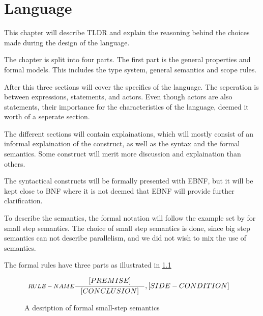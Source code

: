 \chapter{Language}\label{part:design}

This chapter will describe TLDR and explain the reasoning behind the choices made during the design of the language.

The chapter is split into four parts. The first part is the general properties and formal models. This includes the type system, general semantics and scope rules.

After this three sections will cover the specifics of the language. The seperation is between expressions, statements, and actors. Even though actors are also statements, their importance for the characteristics of the language, deemed it worth of a seperate section.

The different sections will contain explainations, which will mostly consist of an informal explaination of the construct, as well as the syntax and the formal semantics. Some construct will merit more discussion and explaination than others.

The syntactical constructs will be formally presented with EBNF, but it will be kept close to BNF where it is not deemed that EBNF will provide further clarification. 

To describe the semantics, the formal notation will follow the example set by \cite{huttel2010transitions} for small step semantics. The choice of small step semantics is done, since big step semantics can not describe parallelism, and we did not wish to mix the use of semantics.

The formal rules have three parts as illustrated in \cref{SS-semantics}

\begin{figure}[H]
\begin{align*}
&\inference[$RULE-NAME$]{[PREMISE]}
                        {[CONCLUSION]}
                        {,[SIDE-CONDITION]}
\end{align*}
\caption{A desription of formal small-step semantics}
\label{SS-semantics}
\end{figure}







